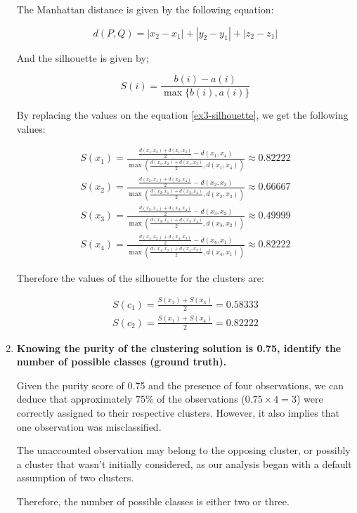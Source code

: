 \documentclass[12pt]{article}
\begin{document}
\begin{enumerate}[leftmargin=\labelsep]
          The Manhattan distance is given by the following equation:

          \begin{equation}\label{ex3-manhattan}
            d(P, Q) = |x_2 - x_1| + |y_2 - y_1| + |z_2 - z_1|
          \end{equation}

          And the silhouette is given by;

          \begin{equation}\label{ex3-silhouette}
            S(i) = \frac{b(i) - a(i)}{\max\{b(i), a(i)\}}
          \end{equation}

          By replacing the values on the equation \eqref{ex3-silhouette}, we get the following values:

          \begin{align*}
              S(x_1) = \frac{\frac{d(x_1, x_2) + d(x_1, x_3)}{2} - d(x_1,x_4)}{\max(\frac{d(x_1, x_2) + d(x_1, x_3)}{2}, d(x_1,x_4))} \approx 0.82222 \\
              S(x_2) = \frac{\frac{d(x_2, x_1) + d(x_2, x_4)}{2} - d(x_2,x_3)}{\max(\frac{d(x_2, x_1) + d(x_2, x_4)}{2}, d(x_2,x_3))} \approx 0.66667 \\
              S(x_3) = \frac{\frac{d(x_3, x_1) + d(x_3, x_4)}{2} - d(x_3,x_2)}{\max(\frac{d(x_3, x_1) + d(x_3, x_4)}{2}, d(x_3,x_2))} \approx 0.49999 \\
              S(x_4) = \frac{\frac{d(x_4, x_2) + d(x_4, x_3)}{2} - d(x_4,x_1)}{\max(\frac{d(x_4, x_2) + d(x_4, x_3)}{2}, d(x_4,x_1))} \approx 0.82222
           \end{align*}

           Therefore the values of the silhouette for the clusters are:

          \begin{align*}
              S(c_1) = \frac{S(x_2) + S(x_3)}{2} = 0.58333 \\
              S(c_2) = \frac{S(x_1) + S(x_4)}{2} = 0.82222
           \end{align*}


    \item \textbf{Knowing the purity of the clustering solution is 0.75, identify the number of possible classes (ground truth).}

          \vskip 0.3cm
          Given the purity score of 0.75 and the presence of four observations, we can deduce that approximately 75\% of the observations ($0.75 \times 4 = 3$)
           were correctly assigned to their respective clusters. However, it also implies that one observation was misclassified.

          The unaccounted observation may belong to the opposing cluster, or possibly a cluster that wasn't initially considered, as our analysis began with a
           default assumption of two clusters.

          Therefore, the number of possible classes is either two or three.
\end{enumerate}
\end{document}
